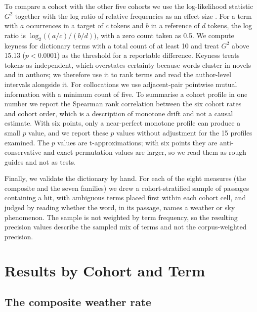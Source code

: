 \documentclass[11pt]{article}
\begin{document}
To compare a cohort with the other five cohorts we use the log-likelihood statistic $G^2$ \citep{dunning1993accurate, rayson2000comparing} together with the log ratio of relative frequencies as an effect size \citep{hardie2014log}. For a term with $a$ occurrences in a target of $c$ tokens and $b$ in a reference of $d$ tokens, the log ratio is $\log_2\big((a/c)/(b/d)\big)$, with a zero count taken as 0.5. We compute keyness for dictionary terms with a total count of at least 10 and treat $G^2$ above 15.13 ($p<0.0001$) as the threshold for a reportable difference. Keyness treats tokens as independent, which overstates certainty because words cluster in novels and in authors; we therefore use it to rank terms and read the author-level intervals alongside it. For collocations we use adjacent-pair pointwise mutual information \citep{church1990word} with a minimum count of five. To summarise a cohort profile in one number we report the Spearman rank correlation between the six cohort rates and cohort order, which is a description of monotone drift and not a causal estimate. With six points, only a near-perfect monotone profile can produce a small $p$ value, and we report these $p$ values without adjustment for the 15 profiles examined. The $p$ values are t-approximations; with six points they are anti-conservative and exact permutation values are larger, so we read them as rough guides and not as tests.

Finally, we validate the dictionary by hand. For each of the eight measures (the composite and the seven families) we drew a cohort-stratified sample of passages containing a hit, with ambiguous terms placed first within each cohort cell, and judged by reading whether the word, in its passage, names a weather or sky phenomenon. The sample is not weighted by term frequency, so the resulting precision values describe the sampled mix of terms and not the corpus-weighted precision.

\section{Results by Cohort and Term}

\subsection{The composite weather rate}
\end{document}
